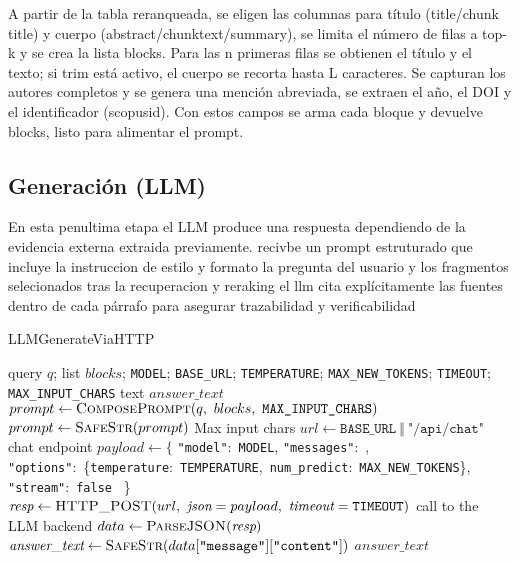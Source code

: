 A partir de la tabla reranqueada, se eligen las columnas para título (title/chunk title) y cuerpo (abstract/chunktext/summary), se limita el número de filas a top-k y se crea la lista blocks. Para las 
n primeras filas se obtienen el título y el texto; si trim está activo, el cuerpo se recorta hasta L
 caracteres. Se capturan los autores completos y se genera una mención abreviada, se extraen el año, el DOI y el identificador (scopusid). Con estos campos se arma cada bloque y devuelve blocks, listo para alimentar el prompt.

\subsection{Generación (LLM)}
En esta penultima etapa el LLM produce una respuesta dependiendo de la evidencia externa extraida previamente. recivbe un prompt estruturado que incluye la instruccion de estilo y formato
la pregunta del usuario y los fragmentos selecionados tras la recuperacion y reraking el llm cita explícitamente las fuentes dentro de cada párrafo para asegurar trazabilidad y verificabilidad
\begin{algorithmEN}[H]
\caption{LLMGenerateViaHTTP}
\begin{algorithmic}[1]
\Require query $q$; list $blocks$; \texttt{MODEL}; \texttt{BASE\_URL}; \texttt{TEMPERATURE}; \texttt{MAX\_NEW\_TOKENS}; \texttt{TIMEOUT}; \texttt{MAX\_INPUT\_CHARS}
\Ensure text $\textit{answer\_text}$
\State $prompt \gets \textsc{ComposePrompt}(q,\ blocks,\ \texttt{MAX\_INPUT\_CHARS})$
\State $prompt \gets \textsc{SafeStr}(prompt)$ \Comment  Max input chars
\State $url \gets \texttt{BASE\_URL}\ \Vert\ \texttt{"/api/chat"}$ \Comment chat endpoint
\State $payload \gets \{$
\Statex \quad \texttt{"model"}:\ \texttt{MODEL},
\Statex \quad \texttt{"messages"}:\ ,
\Statex \quad \texttt{"options"}:\ \{\texttt{temperature}:\ \texttt{TEMPERATURE},\ \texttt{num\_predict}:\ \texttt{MAX\_NEW\_TOKENS}\},
\Statex \quad \texttt{"stream"}:\ \texttt{false}
\Statex \ \}
\State $\textit{resp} \gets \textsc{HTTP\_POST}(url,\ \textit{json}=payload,\ \textit{timeout}=\texttt{TIMEOUT})$ \Comment call to the LLM backend
\State $data \gets \textsc{ParseJSON}(\textit{resp})$
\State $\textit{answer\_text} \gets \textsc{SafeStr}(data[\texttt{"message"}][\texttt{"content"}])$ 
\State \Return $\textit{answer\_text}$
\end{algorithmic}
\end{algorithmEN}

